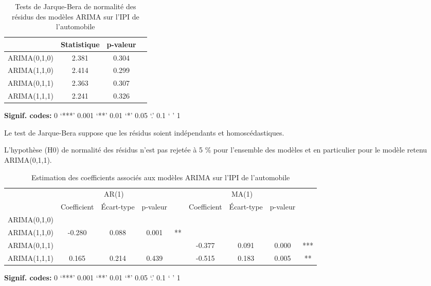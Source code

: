 \documentclass[]{article}
\begin{document}
\begin{table}[!h]

\caption{\label{tab:tabjb}Tests de Jarque-Bera de normalité des résidus des modèles ARIMA sur l'IPI de l'automobile}
\centering
\begin{threeparttable}
\begin{tabular}[t]{lccc}
\toprule
  & Statistique & p-valeur & \\
\midrule
ARIMA(0,1,0) & 2.381 & 0.304 & \\
ARIMA(1,1,0) & 2.414 & 0.299 & \\
ARIMA(0,1,1) & 2.363 & 0.307 & \\
ARIMA(1,1,1) & 2.241 & 0.326 & \\
\bottomrule
\end{tabular}
\begin{tablenotes}
\item \hspace{-0.4cm}\textbf{Signif. codes: }0 `***' 0.001 `**' 0.01 `*' 0.05 `.' 0.1 ` ' 1
\item Le test de Jarque-Bera suppose que les résidus soient indépendants et homoscédastiques.
\item L’hypothèse (H0) de normalité des résidus n’est pas rejetée à 5 \% pour l’ensemble des modèles et en particulier pour le modèle retenu ARIMA(0,1,1).
\end{tablenotes}
\end{threeparttable}
\end{table}

\begin{table}[!h]

\caption{\label{tab:tabcoefs}Estimation des coefficients associés aux modèles ARIMA sur l'IPI de l'automobile}
\centering
\begin{threeparttable}
\begin{tabular}[t]{lcccccccc}
\toprule
\multicolumn{1}{c}{ } & \multicolumn{3}{c}{AR(1)} & \multicolumn{1}{c}{ } & \multicolumn{3}{c}{MA(1)} & \multicolumn{1}{c}{ } \\
\cmidrule(l{3pt}r{3pt}){2-4} \cmidrule(l{3pt}r{3pt}){6-8}
  & Coefficient & Écart-type & p-valeur &  & Coefficient & Écart-type & p-valeur & \\
\midrule
ARIMA(0,1,0) &  &  &  &  &  &  &  & \\
ARIMA(1,1,0) & -0.280 & 0.088 & 0.001 & ** &  &  &  & \\
ARIMA(0,1,1) &  &  &  &  & -0.377 & 0.091 & 0.000 & ***\\
ARIMA(1,1,1) & 0.165 & 0.214 & 0.439 &  & -0.515 & 0.183 & 0.005 & **\\
\bottomrule
\end{tabular}
\begin{tablenotes}
\item \hspace{-0.4cm}\textbf{Signif. codes: }0 `***' 0.001 `**' 0.01 `*' 0.05 `.' 0.1 ` ' 1
\end{tablenotes}
\end{threeparttable}
\end{table}
\end{document}
